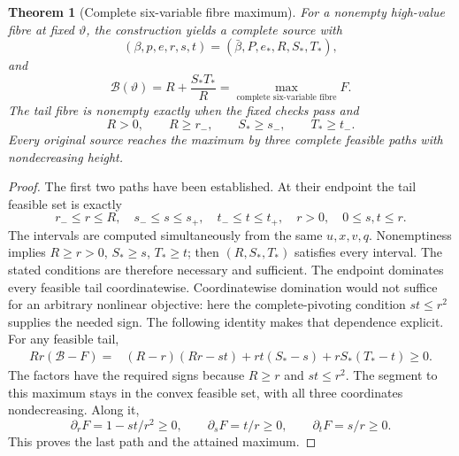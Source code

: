 \documentclass[11pt,reqno]{amsart}
\newtheorem{theorem}{Theorem}[section]
\theoremstyle{definition}
\theoremstyle{remark}
\newcommand{\cB}{\mathcal B}
\begin{document}
\begin{theorem}[Complete six-variable fibre maximum]\label{thm:fibre}
For a nonempty high-value fibre at fixed \(\vartheta\), the
construction yields a complete source with
\[
(\beta,p,e,r,s,t)=(\bar\beta,P,e_*,R,S_*,T_*),
\]
and
\begin{equation}\label{eq:Bcap}
\cB(\vartheta)=R+\frac{S_*T_*}{R}
=\max_{\text{complete six-variable fibre}} F.
\end{equation}
The tail fibre is nonempty exactly when the fixed checks pass and
\[
R>0,\qquad R\ge r_-,\qquad S_*\ge s_-,\qquad T_*\ge t_-.
\]
Every original source reaches the maximum by three complete feasible
paths with nondecreasing height.
\end{theorem}

\begin{proof}
The first two paths have been established. At their endpoint the
tail feasible set is exactly
\[
r_-\le r\le R,\quad s_-\le s\le s_+,\quad
t_-\le t\le t_+,\quad r>0,\quad0\le s,t\le r.
\]
The intervals are computed simultaneously from the same \(u,x,v,q\).
Nonemptiness implies \(R\ge r>0\), \(S_*\ge s\), \(T_*\ge t\);
then \((R,S_*,T_*)\) satisfies every interval. The stated conditions
are therefore necessary and sufficient. The endpoint dominates every
feasible tail coordinatewise. Coordinatewise domination would not suffice
for an arbitrary nonlinear objective: here the complete-pivoting condition
\(st\le r^2\) supplies the needed sign. The following identity makes
that dependence explicit. For any feasible tail,
\begin{align}
Rr(\cB-F)
={}&(R-r)(Rr-st)+rt(S_*-s)+rS_*(T_*-t)\ge0.\label{eq:taildifference}
\end{align}
The factors have the required signs because \(R\ge r\) and
\(st\le r^2\). The segment to this maximum stays in the convex
feasible set, with all three coordinates nondecreasing. Along it,
\[
\partial_rF=1-st/r^2\ge0,\qquad
\partial_sF=t/r\ge0,\qquad \partial_tF=s/r\ge0.
\]
This proves the last path and the attained maximum.
\end{proof}
\end{document}
